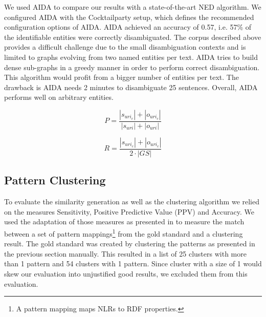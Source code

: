 \documentclass[a4paper]{llncs}
\begin{document}
We used AIDA \cite{HoYoBo2011} to compare our results with a state-of-the-art NED algorithm. 
We configured AIDA with the Cocktailparty setup, which defines the recommended configuration options of AIDA.
AIDA achieved an accuracy of 0.57, i.e. 57\% of the identifiable entities were correctly disambiguated.
The corpus described above provides a difficult challenge due to the small disambiguation contexts and is limited to graphs evolving from two named entities per text.
AIDA tries to build dense sub-graphs in a greedy manner in order to perform correct disambiguation. 
This algorithm would profit from a bigger number of entities per text.
The drawback is AIDA needs 2 minutes to disambiguate 25 sentences.
Overall, AIDA performs well on arbitrary entities.


\vspace{1em}
\noindent\begin{minipage}{.5\linewidth}
\begin{equation}
	\label{eq:p}
  P = \frac{|{s_{uri_c}}|+|{o_{uri_c}}|}{|s_{uri}|+|o_{uri}|}
\end{equation}
\end{minipage}%
\begin{minipage}{.5\linewidth}
\begin{equation}
	\label{eq:r}
  R = \frac{|{s_{uri_c}}|+|{o_{uri_c}}|}{2\cdot|GS|}
\end{equation}
\end{minipage}

\subsection{Pattern Clustering}
To evaluate the similarity generation as well as the clustering algorithm we relied on the measures Sensitivity, Positive Predictive Value (PPV) and Accuracy.
We used the adaptation of those measures as presented in \cite{journals/bmcbi/BroheeH06} to measure the match between a set of pattern mappings\footnote{A pattern mapping maps NLRs to RDF properties.} from the gold standard and a clustering result.
The gold standard was created by clustering the patterns as presented in the previous section manually.
This resulted in a list of 25 clusters with more than 1 pattern and 54 clusters with 1 pattern.
Since cluster with a size of 1 would skew our evaluation into unjustified good results, we excluded them from this evaluation.
\end{document}
